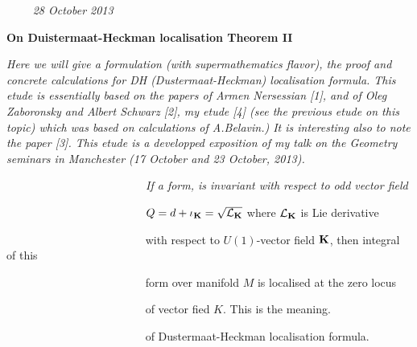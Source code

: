 
\def\vare {\varepsilon}
\def\A {{\bf A}}
\def\FF {{\bf F}}
\def\a {\alpha}
\def\K {{\bf K}}
\def\s {{\sigma}}
\def\p{\partial}
\def\vare{{\varepsilon}}
\def\L {{\cal L}}
\def\G {{\Gamma}}
\def\C {{\bf C}}
\def\Z {{\bf Z}}
\def\U  {{\cal U}}
\def\R  {{\bf R}}
\def\E  {{\bf E}}
\def\l {\lambda}
\def\degree {{\bf {\rm degree}\,\,}}
\def \finish {${\,\,\vrule height1mm depth2mm width 8pt}$}
\def \m {\medskip}
\def\r {{\bf r}}
\def\v {{\bf v}}
\def\n {{\bf n}}
\def\b {{\bf b}}
\def\ss  {{\bf s }}
\def\e{{\bf e}}
\def\ac {{\bf a}}
\def \X   {{\bf X}}
\def \Y   {{\bf Y}}
\def \x   {{\bf x}}
\def \y   {{\bf y}}
\def\w {{\omega}} 
\def\wv {{\buildrel \rightarrow\over \omega}}

\def\K{{\bf K}}
\def\locus {\hbox{locus of $\K$}}


$\qquad$ {\sl 28 October 2013}

\bigskip

\centerline {\bf On Duistermaat-Heckman localisation Theorem II}

\m

{\it
   Here we will give a formulation (with supermathematics flavor),
the proof and concrete calculations
for DH (Dustermaat-Heckman) localisation formula. This etude is essentially
based on the papers of Armen Nersessian [1], and
of  Oleg Zaboronsky and Albert Schwarz [2], my etude
[4] (see the previous etude on this topic) which was based on calculations 
of A.Belavin.) It is interesting also to note the paper [3].
This etude is a  developped exposition of my talk
on the Geometry seminars in Manchester
(17 October and 23 October, 2013).}


\m
      \medskip
{\sl
  $\qquad\qquad$$\qquad\qquad$$\qquad\qquad$ If a form, 
  is invariant with respect to odd vector field


$\qquad\qquad$$\qquad\qquad$$\qquad\qquad$  
  $Q=d+\iota_\K=\sqrt {\L_\K}$ 
   where $\L_\K$ is Lie derivative 

$\qquad\qquad$$\qquad\qquad$$\qquad\qquad$ with respect
 to $U(1)$-vector field $\K$, then integral of this 

$\qquad\qquad$$\qquad\qquad$$\qquad\qquad$ form over manifold
  $M$ is localised at the zero locus 

$\qquad\qquad$$\qquad\qquad$$\qquad\qquad$ of vector fied $K$. This is the
 meaning.

$\qquad\qquad$$\qquad\qquad$$\qquad\qquad$ 
of Dustermaat-Heckman localisation formula.

}
 $$ $$


